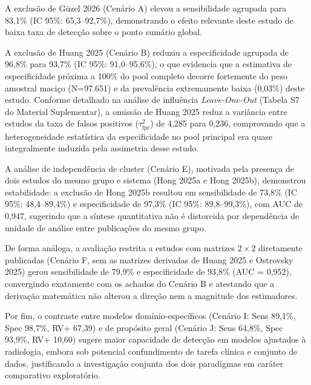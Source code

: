 \documentclass[12pt,a4paper]{article}
\begin{document}
A exclusão de Güzel 2026 (Cenário A) elevou a sensibilidade agrupada para 83,1\% (IC 95\%: 65,3--92,7\%), demonstrando o efeito relevante deste estudo de baixa taxa de detecção sobre o ponto sumário global. 

A exclusão de Huang 2025 (Cenário B) reduziu a especificidade agrupada de 96,8\% para 93,7\% (IC 95\%: 91,0--95,6\%), o que evidencia que a estimativa de especificidade próxima a 100\% do pool completo decorre fortemente do peso amostral maciço (N=97.651) e da prevalência extremamente baixa (0,03\%) deste estudo. Conforme detalhado na análise de influência \textit{Leave-One-Out} (Tabela S7 do Material Suplementar), a omissão de Huang 2025 reduz a variância entre estudos da taxa de falsos positivos ($\tau^2_{\text{fpr}}$) de 4,285 para 0,236, comprovando que a heterogeneidade estatística da especificidade no pool principal era quase integralmente induzida pela assimetria desse estudo.

A análise de independência de cluster (Cenário E), motivada pela presença de dois estudos do mesmo grupo e sistema (Hong 2025a e Hong 2025b), demonstrou estabilidade: a exclusão de Hong 2025b resultou em sensibilidade de 73,8\% (IC 95\%: 48,4--89,4\%) e especificidade de 97,3\% (IC 95\%: 89,8--99,3\%), com AUC de 0,947, sugerindo que a síntese quantitativa não é distorcida por dependência de unidade de análise entre publicações do mesmo grupo.

De forma análoga, a avaliação restrita a estudos com matrizes $2\times 2$ diretamente publicadas (Cenário F, sem as matrizes derivadas de Huang 2025 e Ostrovsky 2025) gerou sensibilidade de 79,9\% e especificidade de 93,8\% (AUC = 0,952), convergindo exatamente com os achados do Cenário B e atestando que a derivação matemática não alterou a direção nem a magnitude dos estimadores.

Por fim, o contraste entre modelos domínio-específicos (Cenário I: Sens 89,1\%, Spec 98,7\%, RV+ 67,39) e de propósito geral (Cenário J: Sens 64,8\%, Spec 93,9\%, RV+ 10,60) sugere maior capacidade de detecção em modelos ajustados à radiologia, embora sob potencial confundimento de tarefa clínica e conjunto de dados, justificando a investigação conjunta dos dois paradigmas em caráter comparativo exploratório.
\end{document}
